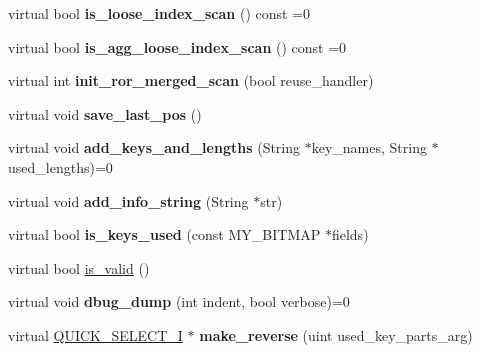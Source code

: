 \begin{DoxyCompactItemize}
virtual bool {\bfseries is\+\_\+loose\+\_\+index\+\_\+scan} () const =0
\item 
\mbox{\label{classQUICK__SELECT__I_a065156cb6c64cbcc9f4cc2b3e4ae9284}} 
virtual bool {\bfseries is\+\_\+agg\+\_\+loose\+\_\+index\+\_\+scan} () const =0
\item 
\mbox{\label{classQUICK__SELECT__I_ae0cdbdc1488b25694a53e7880aab4fe1}} 
virtual int {\bfseries init\+\_\+ror\+\_\+merged\+\_\+scan} (bool reuse\+\_\+handler)
\item 
\mbox{\label{classQUICK__SELECT__I_a75a25273b9fe5c795fab414f338a081c}} 
virtual void {\bfseries save\+\_\+last\+\_\+pos} ()
\item 
\mbox{\label{classQUICK__SELECT__I_ac8536b0996934fe8783feec7334e94a4}} 
virtual void {\bfseries add\+\_\+keys\+\_\+and\+\_\+lengths} (String $\ast$key\+\_\+names, String $\ast$used\+\_\+lengths)=0
\item 
\mbox{\label{classQUICK__SELECT__I_a15ff52dd4771354c7dd33826943de11a}} 
virtual void {\bfseries add\+\_\+info\+\_\+string} (String $\ast$str)
\item 
\mbox{\label{classQUICK__SELECT__I_a0485f8fc938e1da0731a670c04036227}} 
virtual bool {\bfseries is\+\_\+keys\+\_\+used} (const M\+Y\+\_\+\+B\+I\+T\+M\+AP $\ast$fields)
\item 
virtual bool \mbox{\hyperlink{classQUICK__SELECT__I_ae5b342ce5be23d3c7a8d932c1245e0c7}{is\+\_\+valid}} ()
\item 
\mbox{\label{classQUICK__SELECT__I_a9d979b690cdde361094c5461e5b41658}} 
virtual void {\bfseries dbug\+\_\+dump} (int indent, bool verbose)=0
\item 
\mbox{\label{classQUICK__SELECT__I_a64da39c5bcce6c430366c9182ae36540}} 
virtual \mbox{\hyperlink{classQUICK__SELECT__I}{Q\+U\+I\+C\+K\+\_\+\+S\+E\+L\+E\+C\+T\+\_\+I}} $\ast$ {\bfseries make\+\_\+reverse} (uint used\+\_\+key\+\_\+parts\+\_\+arg)
\item 
\mbox{\label{classQUICK__SELECT__I_a2544529c1f2a91fffd83a735848d1085}} 

\end{DoxyCompactItemize}
